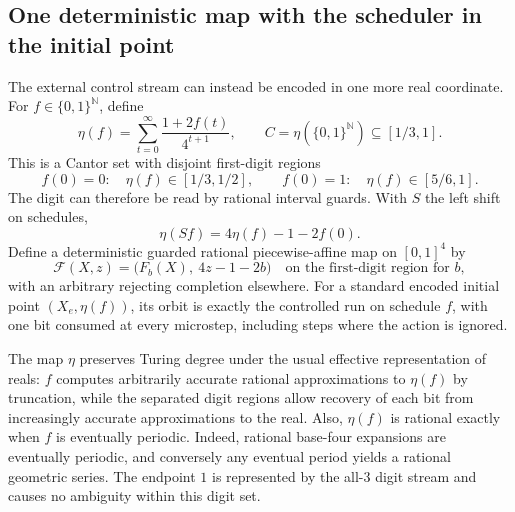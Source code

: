 \documentclass[11pt,letterpaper]{article}
\theoremstyle{definition}
\theoremstyle{remark}
\newcommand{\N}{\mathbb N}
\newcommand{\B}{\{0,1\}}
\newcommand{\Cantor}{\B^{\N}}
\newcommand{\1}{\mathbf 1}
\begin{document}
\subsection{One deterministic map with the scheduler in the initial point}
The external control stream can instead be encoded in one more real
coordinate. For $f\in\Cantor$, define
\begin{equation}\label{lbh:eq:eta}
 \eta(f)=\sum_{t=0}^{\infty}\frac{1+2f(t)}{4^{t+1}},
 \qquad C=\eta(\Cantor)\subseteq[1/3,1].
\end{equation}
This is a Cantor set with disjoint first-digit regions
\[
 f(0)=0:\quad\eta(f)\in[1/3,1/2],
 \qquad
 f(0)=1:\quad\eta(f)\in[5/6,1].
\]
The digit can therefore be read by rational interval guards. With
$S$ the left shift on schedules,
\begin{equation}\label{lbh:eq:shift}
 \eta(Sf)=4\eta(f)-1-2f(0).
\end{equation}
Define a deterministic guarded rational piecewise-affine map on $[0,1]^4$
by
\begin{equation}\label{lbh:eq:autonomous}
 \mathcal F(X,z)=\bigl(F_b(X),\ 4z-1-2b\bigr)
 \quad\text{on the first-digit region for }b,
\end{equation}
with an arbitrary rejecting completion elsewhere. For a standard encoded
initial point $(X_e,\eta(f))$, its orbit is exactly the controlled run on
schedule $f$, with one bit consumed at every microstep, including steps
where the action is ignored.

The map $\eta$ preserves Turing degree under the usual effective
representation of reals: $f$ computes arbitrarily accurate rational
approximations to $\eta(f)$ by truncation, while the separated digit regions
allow recovery of each bit from increasingly accurate approximations to
the real. Also, $\eta(f)$ is rational exactly when $f$ is eventually
periodic. Indeed, rational base-four expansions are eventually periodic,
and conversely any eventual period yields a rational geometric series.
The endpoint $1$ is represented by the all-$3$ digit stream and causes no
ambiguity within this digit set.
\end{document}
